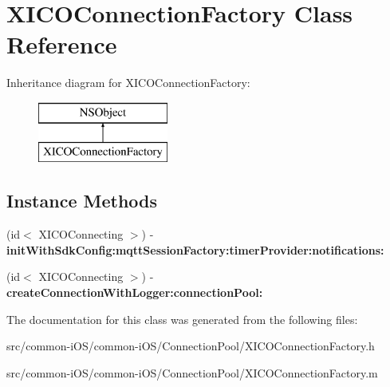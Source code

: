 \hypertarget{interface_x_i_c_o_connection_factory}{}\section{X\+I\+C\+O\+Connection\+Factory Class Reference}
\label{interface_x_i_c_o_connection_factory}
Inheritance diagram for X\+I\+C\+O\+Connection\+Factory\+:\begin{figure}[H]
\begin{center}
\leavevmode
\includegraphics[height=2.000000cm]{interface_x_i_c_o_connection_factory}
\end{center}
\end{figure}
\subsection*{Instance Methods}
\begin{DoxyCompactItemize}
\item 
\hypertarget{interface_x_i_c_o_connection_factory_a978dbad010342d5a0f75dca57f6f4455}{}\label{interface_x_i_c_o_connection_factory_a978dbad010342d5a0f75dca57f6f4455} 
(id$<$ X\+I\+C\+O\+Connecting $>$) -\/ {\bfseries init\+With\+Sdk\+Config\+:mqtt\+Session\+Factory\+:timer\+Provider\+:notifications\+:}
\item 
\hypertarget{interface_x_i_c_o_connection_factory_ad655c7a905589ca9019bd05acce140e6}{}\label{interface_x_i_c_o_connection_factory_ad655c7a905589ca9019bd05acce140e6} 
(id$<$ X\+I\+C\+O\+Connecting $>$) -\/ {\bfseries create\+Connection\+With\+Logger\+:connection\+Pool\+:}
\end{DoxyCompactItemize}


The documentation for this class was generated from the following files\+:\begin{DoxyCompactItemize}
\item 
src/common-\/i\+O\+S/common-\/i\+O\+S/\+Connection\+Pool/X\+I\+C\+O\+Connection\+Factory.\+h\item 
src/common-\/i\+O\+S/common-\/i\+O\+S/\+Connection\+Pool/X\+I\+C\+O\+Connection\+Factory.\+m\end{DoxyCompactItemize}
